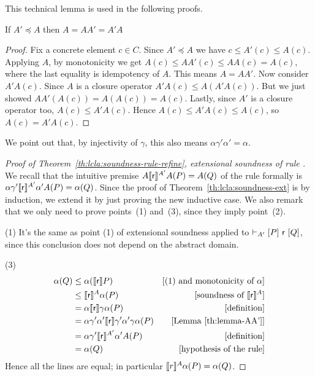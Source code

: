 This technical lemma is used in the following proofs.
\begin{lemma}\label{th:lemma-AA'}
	If $A' \preceq A$ then $A = A A' = A' A$
\end{lemma}
\begin{proof}
	Fix a concrete element $c \in C$. Since $A' \preceq A$ we have $c \le A'(c) \le A(c)$. Applying $A$, by monotonicity we get $A(c) \le AA'(c) \le AA(c) = A(c)$, where the last equality is idempotency of $A$. This means $A = AA'$.
	Now consider $A' A(c)$. Since $A$ is a closure operator $A' A(c) \le A (A' A(c))$. But we just showed $A A' (A(c)) = A (A(c)) = A(c)$. Lastly, since $A'$ is a closure operator too, $A(c) \le A' A(c)$. Hence $A(c) \le A' A(c) \le A(c)$, so $A(c) = A' A(c)$.
\end{proof}
We point out that, by injectivity of $\gamma$, this also means $\alpha \gamma' \alpha' = \alpha$.

\begin{proof}[Proof of Theorem~\ref{th:lcla:soundness-rule-refine}, extensional soundness of rule ]
	We recall that the intuitive premise $A \llbracket\mathsf{r}\rrbracket^{A'} A(P) = A(Q)$ of the rule formally is $\alpha \gamma' \llbracket\mathsf{r}\rrbracket^{A'} \alpha' A(P) = \alpha(Q)$.
	Since the proof of Theorem~\ref{th:lcla:soundness-ext} is by induction, we extend it by just proving the new inductive case. We also remark that we only need to prove points~(1) and~(3), since they imply point~(2).
	
	\noindent (1) It's the same as point (1) of extensional soundness applied to $\vdash_{A'}\nobreak[P]~\mathsf{r}~[Q]$, since this conclusion does not depend on the abstract domain.
	
	\noindent (3)
	\begin{align*}
		\alpha(Q) &\le \alpha(\llbracket\mathsf{r}\rrbracket P) &[\text{(1) and monotonicity of }\alpha] \\
		&\le \llbracket\mathsf{r}\rrbracket^{A} \alpha(P) &[\text{soundness of } \llbracket\mathsf{r}\rrbracket^{A}] \\
		&= \alpha \llbracket\mathsf{r}\rrbracket \gamma \alpha(P) &[\text{definition}] \\
		&= \alpha \gamma' \alpha' \llbracket\mathsf{r}\rrbracket \gamma' \alpha' \gamma \alpha(P) &[\text{Lemma~\ref{th:lemma-AA'}}] \\
		&= \alpha \gamma' \llbracket\mathsf{r}\rrbracket^{A'} \alpha' A(P) &[\text{definition}] \\
		&= \alpha(Q) &[\text{hypothesis of the rule}]
	\end{align*}
	Hence all the lines are equal; in particular $\llbracket r\rrbracket^{A} \alpha(P) = \alpha(Q)$.
\end{proof}

